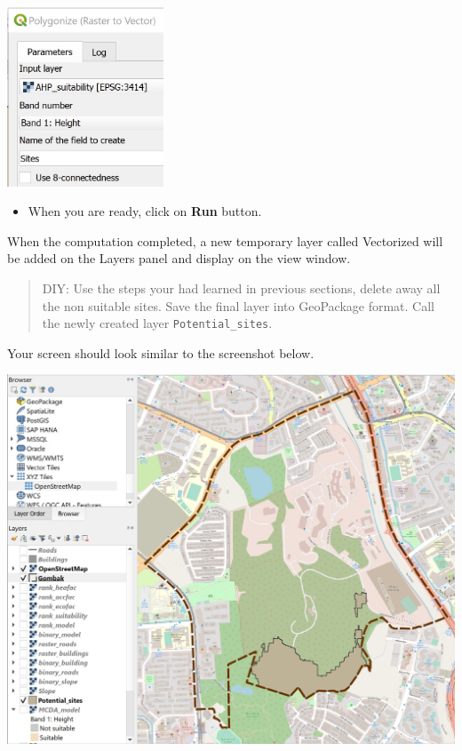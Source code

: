 \documentclass[
  letterpaper,
  DIV=11,
  numbers=noendperiod]{scrreprt}
\providecommand{\tightlist}{%
  \setlength{\itemsep}{0pt}\setlength{\parskip}{0pt}}\usepackage{longtable,booktabs,array}
\begin{document}
\includegraphics[width=0.35\textwidth,height=\textheight]{./img08/image21.jpg}

\begin{itemize}
\tightlist
\item
  When you are ready, click on \textbf{Run} button.
\end{itemize}

When the computation completed, a new temporary layer called Vectorized
will be added on the Layers panel and display on the view window.

\begin{quote}
DIY: Use the steps your had learned in previous sections, delete away
all the non suitable sites. Save the final layer into GeoPackage format.
Call the newly created layer \texttt{Potential\_sites}.
\end{quote}

Your screen should look similar to the screenshot below.

\includegraphics{./img08/image22.jpg}
\end{document}
